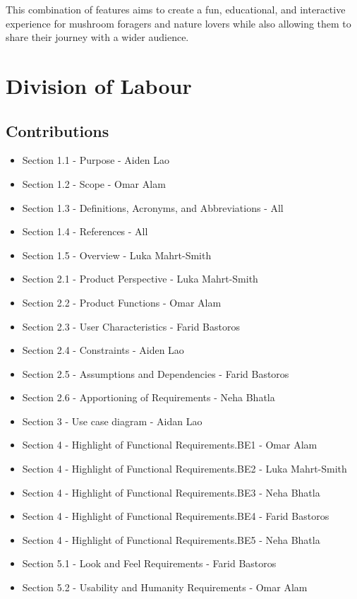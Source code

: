 \documentclass{article}
\begin{document}
This combination of features aims to create a fun, educational, and interactive experience for mushroom foragers and nature lovers while also allowing them to share their journey with a wider audience.
\endgroup 
\appendix
\newpage
\section{Division of Labour}
\label{sec:division_of_labour}

\subsection{Contributions}


\begin{itemize}
	\item Section 1.1 - Purpose - Aiden Lao
	\item Section 1.2 - Scope - Omar Alam
	\item Section 1.3 - Definitions, Acronyms, and Abbreviations - All
	\item Section 1.4 - References - All
	\item Section 1.5 - Overview - Luka Mahrt-Smith
	\item Section 2.1 - Product Perspective - Luka Mahrt-Smith
	\item Section 2.2 - Product Functions - Omar Alam
	\item Section 2.3 - User Characteristics - Farid Bastoros
	\item Section 2.4 - Constraints - Aiden Lao
	\item Section 2.5 - Assumptions and Dependencies - Farid Bastoros
	\item Section 2.6 - Apportioning of Requirements - Neha Bhatla
	\item Section 3 - Use case diagram - Aidan Lao
	\item Section 4 - Highlight of Functional Requirements.BE1 - Omar Alam
	\item Section 4 - Highlight of Functional Requirements.BE2 - Luka Mahrt-Smith
	\item Section 4 - Highlight of Functional Requirements.BE3 - Neha Bhatla
	\item Section 4 - Highlight of Functional Requirements.BE4 - Farid Bastoros
	\item Section 4 - Highlight of Functional Requirements.BE5 - Neha Bhatla
	\item Section 5.1 - Look and Feel Requirements - Farid Bastoros
	\item Section 5.2 - Usability and Humanity Requirements - Omar Alam

\end{itemize}
\end{document}
